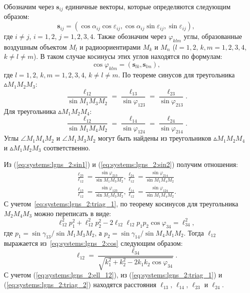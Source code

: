 \documentclass[../main.tex]{subfiles}
\begin{document}
Обозначим через $\mathbf{s}_{ij}$ единичные векторы, которые определяются следующим образом:
\begin{equation}
    \mathbf{s}_{ij} = \left(\cos\alpha_{ij} \cos\varepsilon_{ij}, \cos\alpha_{ij} \sin\varepsilon_{ij}, \sin\varepsilon_{ij}\right),
\end{equation}
где $i \ne j$, $i = 1,2$, $j = 1,2,3,4$. Также обозначим через $\varphi_{klm}$ углы, образованные воздушным объектом $M_l$ и радиоориентирами $M_k$ и $M_n$ ($l = 1,2$, $k,m = 1,2,3,4$, $k \ne l \ne m$). В таком случае косинусы этих углов находятся по формулам:
\begin{equation*}
  \cos\varphi_{klm} = \left(\mathbf{s}_{lk}, \mathbf{s}_{lm}\right),
\end{equation*}
где $l = 1,2$, $k,m = 1,2,3,4$, $k \ne l \ne m$. По теореме синусов для треугольника $\vartriangle M_1 M_2 M_3$:
\begin{equation}\label{eq:systems:lgns_2:sin1}
    \frac{\ell_{12}}{\sin{M_1 M_3 M_2}} = \frac{\ell_{13}}{\sin{\varphi_{123}}} = \frac{\ell_{23}}{\sin{\varphi_{213}}}.
\end{equation}
Для треугольника $\vartriangle M_1 M_2 M_4$:
\begin{equation}\label{eq:systems:lgns_2:sin2}
    \frac{\ell_{12}}{\sin{M_1 M_4 M_2}} = \frac{\ell_{14}}{\sin{\varphi_{124}}} = \frac{\ell_{24}}{\sin{\varphi_{214}}}.
\end{equation}
Углы $\angle M_1 M_4 M_2$ и $\angle M_1 M_3 M_2$ могут быть найдены из треугольников  $\vartriangle M_1 M_2 M_4$ и  $\vartriangle M_1 M_2 M_3$ соответственно.

Из (\ref{eq:systems:lgns_2:sin1}) и (\ref{eq:systems:lgns_2:sin2}) получим отношения:
\begin{align}
     \frac{\ell_{23}}{\ell_{12}} = \frac{\sin{\varphi_{213}}}{\sin{M_1 M_3 M_2}}, \frac{\ell_{24}}{\ell_{12}} = \frac{\sin{\varphi_{214}}}{\sin{M_1 M_4 M_2}} \label{eq:systems:lgns_2:triag_1}\\
     \frac{\ell_{13}}{\ell_{12}} = \frac{\sin{\varphi_{123}}}{\sin{M_1 M_3 M_2}}, \frac{\ell_{14}}{\ell_{12}} = \frac{\sin{\varphi_{124}}}{\sin{M_1 M_4 M_2}} \label{eq:systems:lgns_2:triag_2}.
\end{align}
С учетом~\eqref{eq:systems:lgns_2:triag_1}, по теорему косинусов для треугольника $M_2 M_4 M_3$ можно переписать в виде:
\begin{equation}\label{eq:systems:lgns_2:cos}
    \ell_{12}^2 p_1^2 + \ell_{12}^2 p_2^2 - 2 \ell_{12} \ell_{12} p_1 p_2 \cos\varphi_{34} = \ell_{34}^2,
\end{equation}
где $p_1 = \sin\gamma_{13} / \sin{M_1 M_3 M_2}$, а $p_2 = \sin\gamma_{14} / \sin{M_4 M_1 M_2}$. Тогда $\ell_{12}$ выражается из~\eqref{eq:systems:lgns_2:cos} следующим образом:
\begin{equation}\label{eq:systems:lgns_2:ell_12}
    \ell_{12} = \frac{\ell_{34}}{\sqrt{k_1^2 + k_2 ^2 - 2 k_1 k_2 \cos\varphi_{34}}}.
\end{equation}
С учетом (\ref{eq:systems:lgns_2:ell_12}), из (\ref{eq:systems:lgns_2:triag_1}) и (\ref{eq:systems:lgns_2:triag_2}) находятся расстояния $\ell_{13}$, $\ell_{14}$, $\ell_{23}$ и $\ell_{24}$.
\end{document}
